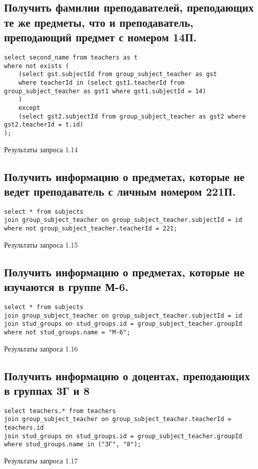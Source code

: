 \documentclass[a4paper,8pt]{article}
\begin{document}
\subsection{Получить фамилии преподавателей, преподающих те же предметы, что и преподаватель, преподающий предмет с номером 14П.}
\begin{verbatim}
select second_name from teachers as t
where not exists (
	(select gst.subjectId from group_subject_teacher as gst 
    where teacherId in (select gst1.teacherId from group_subject_teacher as gst1 where gst1.subjectId = 14) 
    )
    except 
    (select gst2.subjectId from group_subject_teacher as gst2 where gst2.teacherId = t.id) 
);
\end{verbatim}
\begin{table}[H]
\centering

\caption{Результаты запроса 1.14}
\end{table}

\subsection{Получить информацию о предметах, которые не ведет преподаватель с личным номером 221П.}
\begin{verbatim}
select * from subjects
join group_subject_teacher on group_subject_teacher.subjectId = id
where not group_subject_teacher.teacherId = 221;
\end{verbatim}
\begin{table}[H]
\centering

\caption{Результаты запроса 1.15}
\end{table}

\subsection{Получить информацию о предметах, которые не изучаются в группе М-6.}
\begin{verbatim}
select * from subjects
join group_subject_teacher on group_subject_teacher.subjectId = id
join stud_groups on stud_groups.id = group_subject_teacher.groupId
where not stud_groups.name = "M-6";
\end{verbatim}
\begin{table}[H]
\centering

\caption{Результаты запроса 1.16}
\end{table}

\subsection{Получить информацию о доцентах, преподающих в группах 3Г и 8}
\begin{verbatim}
select teachers.* from teachers
join group_subject_teacher on group_subject_teacher.teacherId = teachers.id
join stud_groups on stud_groups.id = group_subject_teacher.groupId
where stud_groups.name in ("3Г", "8");
\end{verbatim}
\begin{table}[H]
\centering

\caption{Результаты запроса 1.17}
\end{table}
\end{document}
